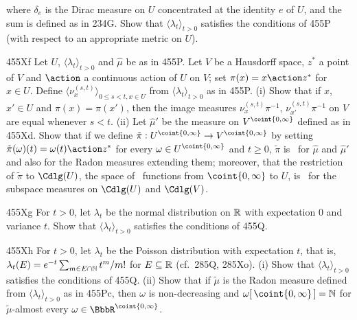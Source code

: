 {

\noindent where $\delta_e$ is the Dirac measure on $U$ concentrated at the
identity $e$ of $U$, and the sum is defined as in 234G.
Show that $\langle\lambda_t\rangle_{t>0}$ satisfies the
conditions of 455P (with respect to an appropriate metric on $U$).

\spheader 455Xf Let $U$, $\langle\lambda_t\rangle_{t>0}$ and $\hat\mu$ be
as in 455P.   Let $V$ be a Hausdorff space, $z^*$ a point of $V$ and
$\action$ a continuous action of $U$ on $V$;  set
$\pi(x)=x\action z^*$ for $x\in U$.   Define
$\langle\nu^{(s,t)}_x\rangle_{0\le s<t,x\in U}$ from
$\langle\lambda_t\rangle_{t>0}$ as in 455P.   (i) Show that if $x$,
$x'\in U$ and $\pi(x)=\pi(x')$, then the image measures
$\nu^{(s,t)}_x\pi^{-1}$, $\nu^{(s,t)}_{x'}\pi^{-1}$ on $V$ are equal
whenever $s<t$.   (ii) Let $\hat\mu'$ be the measure on
$V^{\coint{0,\infty}}$ defined as in 455Xd.   Show that if we define
$\tilde\pi:U^{\coint{0,\infty}}\to V^{\coint{0,\infty}}$ by setting
$\tilde\pi(\omega)(t)=\omega(t)\action z^*$ for every
$\omega\in U^{\coint{0,\infty}}$ and $t\ge 0$, $\tilde\pi$ is \imp\ for
$\hat\mu$ and $\hat\mu'$ and also for the Radon measures extending them;
moreover, that the restriction of $\tilde\pi$ to $\Cdlg(U)$, the space
of \cadlag\ functions from $\coint{0,\infty}$ to $U$, is \imp\ for the
subspace measures on $\Cdlg(U)$ and $\Cdlg(V)$.

\sqheader 455Xg For $t>0$, let $\lambda_t$ be the normal distribution on
$\Bbb R$ with expectation $0$ and variance $t$.
Show that $\langle\lambda_t\rangle_{t>0}$ satisfies the conditions of
455Q.

\sqheader 455Xh For $t>0$, let $\lambda_t$ be the Poisson
distribution with expectation $t$, that is,
$\lambda_t(E)=e^{-t}\sum_{m\in E\cap\Bbb N}t^m/m!$ for $E\subseteq\Bbb R$
(cf.\ 285Q, 285Xo).
(i) Show that $\langle\lambda_t\rangle_{t>0}$ satisfies the conditions of
455Q.
(ii) Show that if $\tilde\mu$ is the Radon measure defined from
$\langle\lambda_t\rangle_{t>0}$ as in 455Pc,
then $\omega$ is non-decreasing
and $\omega[\,\coint{0,\infty}\,]=\Bbb N$ for $\tilde\mu$-almost every
$\omega\in\BbbR^{\coint{0,\infty}}$.

}
